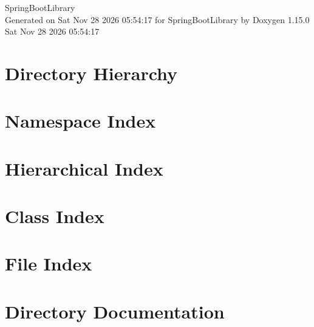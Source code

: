 \documentclass[twoside]{book}
\newcommand{\+}{\discretionary{\mbox{\scriptsize$\hookleftarrow$}}{}{}}
\newcommand{\clearemptydoublepage}{%
    \newpage{\pagestyle{empty}\cleardoublepage}%
  }
\begin{document}
  \raggedbottom
    \hypersetup{pageanchor=false,
                bookmarksnumbered=true,
                pdfencoding=unicode
               }
  \begin{titlepage}
  \vspace*{7cm}
  \begin{center}%
  {\Large Spring\+Boot\+Library}\\
  \vspace*{1cm}
  {\large Generated on Sat Nov 28 2026 05\+:54\+:17 for Spring\+Boot\+Library by Doxygen 1.15.0}\\
    \vspace*{0.5cm}
    {\small Sat Nov 28 2026 05:54:17}
  \end{center}
  \end{titlepage}
  \clearemptydoublepage
  \tableofcontents
  \clearemptydoublepage
  \hypersetup{pageanchor=true}
\chapter{Directory Hierarchy}

\chapter{Namespace Index}

\chapter{Hierarchical Index}

\chapter{Class Index}

\chapter{File Index}

\chapter{Directory Documentation}



















\end{document}

